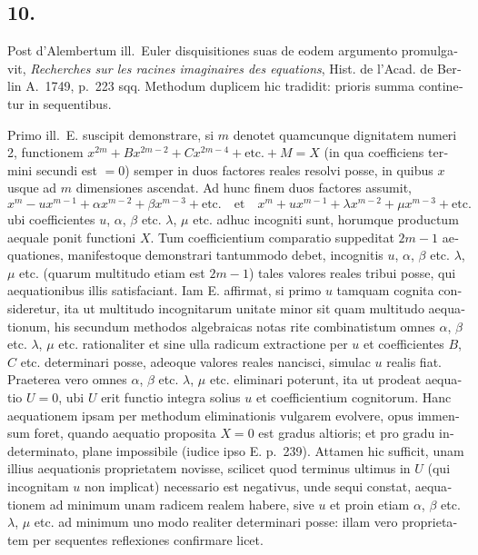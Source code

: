 \documentclass[12pt,a4paper]{article}
\begin{document}
\begin{otherlanguage}{latin}
\subsection*{10.}
Post d'Alembertum ill.~Euler disquisitiones suas de eodem argumento promulgavit, \textit{Recherches sur les racines imaginaires des equations}, Hist. de l'Acad. de Berlin A.~1749, p.~223 sqq. Methodum duplicem hic tradidit: prioris summa continetur in sequentibus.

Primo ill.~E. suscipit demonstrare, si $m$ denotet quamcunque dignitatem numeri 2, functionem $x^{2m}+Bx^{2m-2}+Cx^{2m-4}+\text{etc.}+M=X$ (in qua coefficiens termini secundi est $=0$) semper in duos factores reales resolvi posse, in quibus $x$ usque ad $m$ dimensiones ascendat. Ad hunc finem duos factores assumit,
\[x^{m}-ux^{m-1}+\alpha x^{m-2}+\beta x^{m-3}+\text{etc.}\quad\text{et}\quad x^{m}+ux^{m-1}+\lambda x^{m-2}+\mu x^{m-3}+\text{etc.}\]
ubi coefficientes $u$, $\alpha$, $\beta$ etc. $\lambda$, $\mu$ etc. adhuc incogniti sunt, horumque productum aequale ponit functioni $X$. Tum coefficientium comparatio suppeditat $2m-1$ aequationes, manifestoque demonstrari tantummodo debet, incognitis $u$, $\alpha$, $\beta$ etc. $\lambda$, $\mu$ etc. (quarum multitudo etiam est $2m-1$) tales valores reales tribui posse, qui aequationibus illis satisfaciant. Iam E. affirmat, si primo $u$ tamquam cognita consideretur, ita ut multitudo incognitarum unitate minor sit quam multitudo aequationum, his secundum methodos algebraicas notas rite combinatistum omnes $\alpha$, $\beta$ etc. $\lambda$, $\mu$ etc. rationaliter et sine ulla radicum extractione per $u$ et coefficientes $B$, $C$ etc. determinari posse, adeoque valores reales nancisci, simulac $u$ realis fiat. Praeterea vero omnes $\alpha$, $\beta$ etc. $\lambda$, $\mu$ etc. eliminari poterunt, ita ut prodeat aequatio $U=0$, ubi $U$ erit functio integra solius $u$ et coefficientium cognitorum. Hanc aequationem ipsam per methodum eliminationis vulgarem evolvere, opus immensum foret, quando aequatio proposita $X=0$ est gradus altioris; et pro gradu indeterminato, plane impossibile (iudice ipso E. p.~239). Attamen hic sufficit, unam illius aequationis proprietatem novisse, scilicet quod terminus ultimus in $U$ (qui incognitam $u$ non implicat) necessario est negativus, unde sequi constat, aequationem ad minimum unam radicem realem habere, sive $u$ et proin etiam $\alpha$, $\beta$ etc. $\lambda$, $\mu$ etc. ad minimum uno modo realiter determinari posse: illam vero proprietatem per sequentes reflexiones confirmare licet.


\end{otherlanguage}
\end{document}
